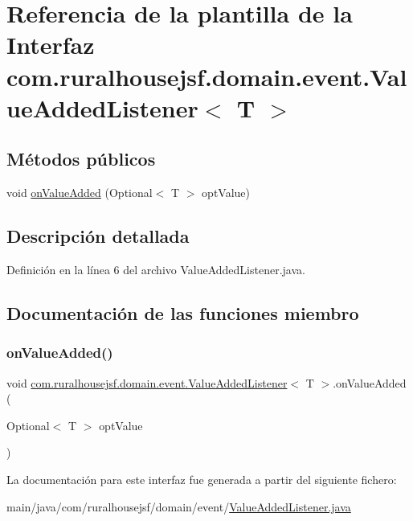 \hypertarget{interfacecom_1_1ruralhousejsf_1_1domain_1_1event_1_1_value_added_listener}{}\section{Referencia de la plantilla de la Interfaz com.\+ruralhousejsf.\+domain.\+event.\+Value\+Added\+Listener$<$ T $>$}
\label{interfacecom_1_1ruralhousejsf_1_1domain_1_1event_1_1_value_added_listener}
\subsection*{Métodos públicos}
\begin{DoxyCompactItemize}
\item 
void \mbox{\hyperlink{interfacecom_1_1ruralhousejsf_1_1domain_1_1event_1_1_value_added_listener_a69af10ae4e2b293b64b2f337482e6ad8}{on\+Value\+Added}} (Optional$<$ T $>$ opt\+Value)
\end{DoxyCompactItemize}


\subsection{Descripción detallada}


Definición en la línea 6 del archivo Value\+Added\+Listener.\+java.



\subsection{Documentación de las funciones miembro}
\mbox{\label{interfacecom_1_1ruralhousejsf_1_1domain_1_1event_1_1_value_added_listener_a69af10ae4e2b293b64b2f337482e6ad8}} 
\subsubsection{\texorpdfstring{onValueAdded()}{onValueAdded()}}
{\footnotesize\ttfamily void \mbox{\hyperlink{interfacecom_1_1ruralhousejsf_1_1domain_1_1event_1_1_value_added_listener}{com.\+ruralhousejsf.\+domain.\+event.\+Value\+Added\+Listener}}$<$ T $>$.on\+Value\+Added (\begin{DoxyParamCaption}\item[{Optional$<$ T $>$}]{opt\+Value }\end{DoxyParamCaption})}



La documentación para este interfaz fue generada a partir del siguiente fichero\+:\begin{DoxyCompactItemize}
\item 
main/java/com/ruralhousejsf/domain/event/\mbox{\hyperlink{_value_added_listener_8java}{Value\+Added\+Listener.\+java}}\end{DoxyCompactItemize}
